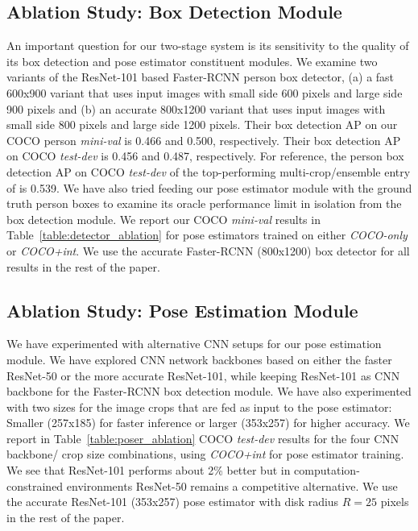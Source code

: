 \documentclass[10pt,twocolumn,letterpaper]{article}
\begin{document}
\subsection{Ablation Study: Box Detection Module}

An important question for our two-stage system is its sensitivity to the quality of its box detection and pose estimator constituent modules. We examine two variants of the ResNet-101 based Faster-RCNN person box detector, (a) a fast 600x900 variant that uses input images with small side 600 pixels and large side 900 pixels and (b) an accurate 800x1200 variant that uses input images with small side 800 pixels and large side 1200 pixels. Their box detection AP on our COCO person \emph{mini-val} is 0.466 and 0.500, respectively. Their box detection AP on COCO \emph{test-dev} is 0.456 and 0.487, respectively. For reference, the person box detection AP on COCO \emph{test-dev} of the top-performing multi-crop/ensemble entry of \cite{huang2016speed} is 0.539. We have also tried feeding our pose estimator module with the ground truth person boxes to examine its oracle performance limit in isolation from the box detection module. We report our COCO \emph{mini-val} results in Table~\ref{table:detector_ablation} for pose estimators trained on either \emph{COCO-only} or \emph{COCO+int}. We use the accurate Faster-RCNN (800x1200) box detector for all results in the rest of the paper.

\subsection{Ablation Study: Pose Estimation Module}

We have experimented with alternative CNN setups for our pose estimation module. We have explored CNN network backbones based on either the faster ResNet-50 or the more accurate ResNet-101, while keeping ResNet-101 as CNN backbone for the Faster-RCNN box detection module. We have also experimented with two sizes for the image crops that are fed as input to the pose estimator: Smaller (257x185) for faster inference or larger (353x257) for higher accuracy. We report in Table~\ref{table:poser_ablation} COCO \emph{test-dev} results for the four CNN backbone/ crop size combinations, using \emph{COCO+int} for pose estimator training. We see that ResNet-101 performs about 2\% better but in computation-constrained environments ResNet-50 remains a competitive alternative. We use the accurate ResNet-101 (353x257) pose estimator with disk radius $R=25$ pixels in the rest of the paper.
\end{document}

